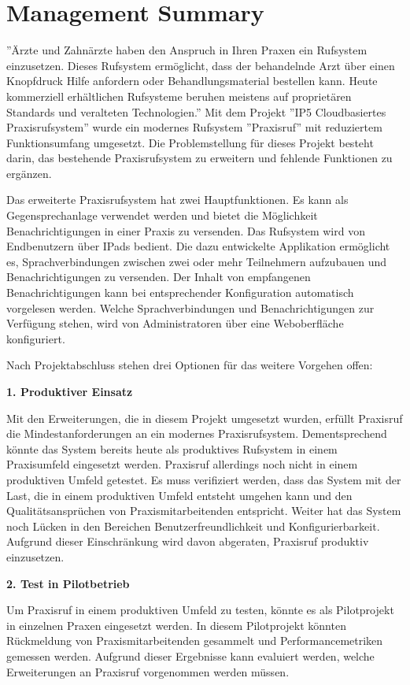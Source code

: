 \section*{Management Summary}

''Ärzte und Zahnärzte haben den Anspruch in Ihren Praxen ein Rufsystem einzusetzen.
Dieses Rufsystem ermöglicht, dass der behandelnde Arzt über einen Knopfdruck Hilfe anfordern oder Behandlungsmaterial bestellen kann.
Heute kommerziell erhältlichen Rufsysteme beruhen meistens auf proprietären Standards und veralteten Technologien.''\cite{aufgabenstellung}
Mit dem Projekt ''IP5 Cloudbasiertes Praxisrufsystem'' wurde ein modernes Rufsystem ''Praxisruf'' mit reduziertem Funktionsumfang umgesetzt.
Die Problemstellung für dieses Projekt besteht darin, das bestehende Praxisrufsystem zu erweitern und fehlende Funktionen zu ergänzen.

Das erweiterte Praxisrufsystem hat zwei Hauptfunktionen.
Es kann als Gegensprechanlage verwendet werden und bietet die Möglichkeit Benachrichtigungen in einer Praxis zu versenden.
Das Rufsystem wird von Endbenutzern über IPads bedient.
Die dazu entwickelte Applikation ermöglicht es, Sprachverbindungen zwischen zwei oder mehr Teilnehmern aufzubauen und Benachrichtigungen zu versenden.
Der Inhalt von empfangenen Benachrichtigungen kann bei entsprechender Konfiguration automatisch vorgelesen werden.
Welche Sprachverbindungen und Benachrichtigungen zur Verfügung stehen, wird von Administratoren über eine Weboberfläche konfiguriert.

Nach Projektabschluss stehen drei Optionen für das weitere Vorgehen offen:

\textbf{1. Produktiver Einsatz}

Mit den Erweiterungen, die in diesem Projekt umgesetzt wurden, erfüllt Praxisruf die Mindestanforderungen an ein modernes Praxisrufsystem.
Dementsprechend könnte das System bereits heute als produktives Rufsystem in einem Praxisumfeld eingesetzt werden.
Praxisruf allerdings noch nicht in einem produktiven Umfeld getestet.
Es muss verifiziert werden, dass das System mit der Last, die in einem produktiven Umfeld entsteht umgehen kann und den Qualitätsansprüchen von Praxismitarbeitenden entspricht.
Weiter hat das System noch Lücken in den Bereichen Benutzerfreundlichkeit und Konfigurierbarkeit.
Aufgrund dieser Einschränkung wird davon abgeraten, Praxisruf produktiv einzusetzen.

\textbf{2. Test in Pilotbetrieb}

Um Praxisruf in einem produktiven Umfeld zu testen, könnte es als Pilotprojekt in einzelnen Praxen eingesetzt werden.
In diesem Pilotprojekt könnten Rückmeldung von Praxismitarbeitenden gesammelt und Performancemetriken gemessen werden.
Aufgrund dieser Ergebnisse kann evaluiert werden, welche Erweiterungen an Praxisruf vorgenommen werden müssen.

